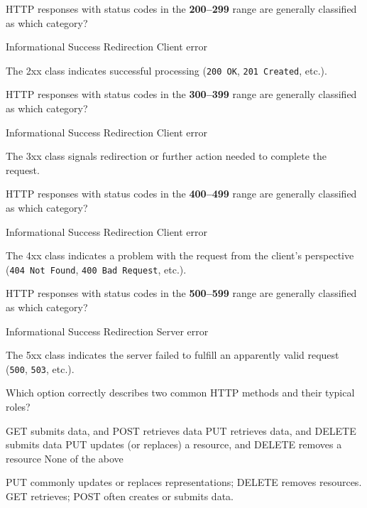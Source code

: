 \question[4]
HTTP responses with status codes in the \textbf{200--299} range are generally classified as which category?
\begin{choices}
  \choice Informational
  \CorrectChoice Success
  \choice Redirection
  \choice Client error
\end{choices}
\begin{solution}
  The 2xx class indicates successful processing (\texttt{200 OK}, \texttt{201 Created}, etc.).
\end{solution}


\question[4]
HTTP responses with status codes in the \textbf{300--399} range are generally classified as which category?
\begin{choices}
  \choice Informational
  \choice Success
  \CorrectChoice Redirection
  \choice Client error
\end{choices}
\begin{solution}
  The 3xx class signals redirection or further action needed to complete the request.
\end{solution}



\question[4]
HTTP responses with status codes in the \textbf{400--499} range are generally classified as which category?
\begin{choices}
  \choice Informational
  \choice Success
  \choice Redirection
  \CorrectChoice Client error
\end{choices}
\begin{solution}
  The 4xx class indicates a problem with the request from the client's perspective (\texttt{404 Not Found}, \texttt{400 Bad Request}, etc.).
\end{solution}


\newpage

\question[4]
HTTP responses with status codes in the \textbf{500--599} range are generally classified as which category?
\begin{choices}
  \choice Informational
  \choice Success
  \choice Redirection
  \CorrectChoice Server error
\end{choices}
\begin{solution}
  The 5xx class indicates the server failed to fulfill an apparently valid request (\texttt{500}, \texttt{503}, etc.).
\end{solution}

\question[4]
Which option correctly describes two common HTTP methods and their typical roles?
\begin{choices}
  \choice GET submits data, and POST retrieves data
  \choice PUT retrieves data, and DELETE submits data
  \CorrectChoice PUT updates (or replaces) a resource, and DELETE removes a resource
  \choice None of the above
\end{choices}
\begin{solution}
  PUT commonly updates or replaces representations; DELETE removes resources. GET retrieves; POST often creates or submits data.
\end{solution}



